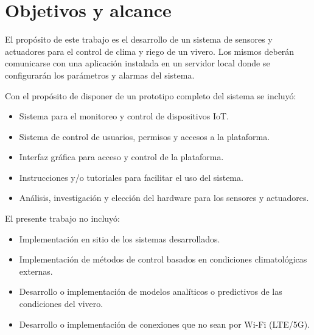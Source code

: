 
\section{Objetivos y alcance}


El propósito de este trabajo es el desarrollo de un sistema de sensores y actuadores para el control de clima y riego de un vivero. Los mismos deberán comunicarse con una aplicación instalada en un servidor local donde se configurarán los parámetros y alarmas del sistema.

Con el propósito de disponer de un prototipo completo del sistema se incluyó:
 
\begin{itemize}
	\item Sistema para el monitoreo y control de dispositivos IoT.
	\item Sistema de control de usuarios, permisos y accesos a la plataforma.
	\item Interfaz gráfica para acceso y control de la plataforma.
	\item Instrucciones y/o tutoriales para facilitar el uso del sistema.
	\item Análisis, investigación y elección del hardware para los sensores y actuadores.


\end{itemize}


El presente trabajo no incluyó:
\begin{itemize}
	\item Implementación en sitio de los sistemas desarrollados.
	\item Implementación de métodos de control basados en condiciones climatológicas externas.
	\item Desarrollo o implementación de modelos analíticos o predictivos de las condiciones del vivero.
	\item Desarrollo o implementación de conexiones que no sean por Wi-Fi (LTE/5G). 
	
\end{itemize}